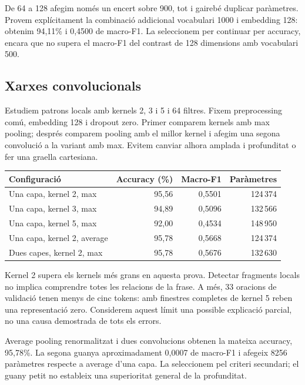 \documentclass[11pt,a4paper]{article}
\begin{document}
De 64 a 128 afegim només un encert sobre 900, tot i gairebé duplicar paràmetres. Provem explícitament la combinació addicional vocabulari 1000 i embedding 128: obtenim 94,11\% i 0,4500 de macro-F1. La seleccionem per continuar per accuracy, encara que no supera el macro-F1 del contrast de 128 dimensions amb vocabulari 500.

\newpage
\subsection{Xarxes convolucionals}
Estudiem patrons locals amb kernels 2, 3 i 5 i 64 filtres. Fixem preprocessing comú, embedding 128 i dropout zero. Primer comparem kernels amb max pooling; després comparem pooling amb el millor kernel i afegim una segona convolució a la variant amb max. Evitem canviar alhora amplada i profunditat o fer una graella cartesiana.

\begin{center}
\small
\begin{tabular}{lrrr}
\toprule
Configuració & Accuracy (\%) & Macro-F1 & Paràmetres\\
\midrule
Una capa, kernel 2, max & 95,56 & 0,5501 & 124\,374 \\
Una capa, kernel 3, max & 94,89 & 0,5096 & 132\,566 \\
Una capa, kernel 5, max & 92,00 & 0,4534 & 148\,950 \\
Una capa, kernel 2, average & 95,78 & 0,5668 & 124\,374 \\
Dues capes, kernel 2, max & 95,78 & 0,5676 & 132\,630 \\
\bottomrule
\end{tabular}
\end{center}

Kernel 2 supera els kernels més grans en aquesta prova. Detectar fragments locals no implica comprendre totes les relacions de la frase. A més, 33 oracions de validació tenen menys de cinc tokens: amb finestres completes de kernel 5 reben una representació zero. Considerem aquest límit una possible explicació parcial, no una causa demostrada de tots els errors.

Average pooling renormalitzat i dues convolucions obtenen la mateixa accuracy, 95,78\%. La segona guanya aproximadament 0,0007 de macro-F1 i afegeix 8256 paràmetres respecte a average d'una capa. La seleccionem pel criteri secundari; el guany petit no estableix una superioritat general de la profunditat.
\end{document}
